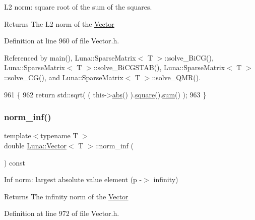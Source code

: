 L2 norm\+: square root of the sum of the squares. 

\begin{DoxyReturn}{Returns}
The L2 norm of the \hyperlink{classLuna_1_1Vector}{Vector} 
\end{DoxyReturn}


Definition at line 960 of file Vector.\+h.



Referenced by main(), Luna\+::\+Sparse\+Matrix$<$ T $>$\+::solve\+\_\+\+Bi\+C\+G(), Luna\+::\+Sparse\+Matrix$<$ T $>$\+::solve\+\_\+\+Bi\+C\+G\+S\+T\+A\+B(), Luna\+::\+Sparse\+Matrix$<$ T $>$\+::solve\+\_\+\+C\+G(), and Luna\+::\+Sparse\+Matrix$<$ T $>$\+::solve\+\_\+\+Q\+M\+R().


\begin{DoxyCode}
961   \{
962     \textcolor{keywordflow}{return} std::sqrt( ( this->\hyperlink{classLuna_1_1Vector_a1fe66d19f6641be9e301a306fdb58cbe}{abs}() ).\hyperlink{classLuna_1_1Vector_a60f8017f50e602151c84686ac081af66}{square}().\hyperlink{classLuna_1_1Vector_a3f9422b246093b153a55577a6ca97e26}{sum}() );
963   \}
\end{DoxyCode}
\mbox{\label{classLuna_1_1Vector_a54e835cea735921c7487fb2451bca258}} 
\subsubsection{\texorpdfstring{norm\+\_\+inf()}{norm\_inf()}}
{\footnotesize\ttfamily template$<$typename T $>$ \\
double \hyperlink{classLuna_1_1Vector}{Luna\+::\+Vector}$<$ T $>$\+::norm\+\_\+inf (\begin{DoxyParamCaption}{ }\end{DoxyParamCaption}) const\hspace{0.3cm}{\ttfamily [inline]}}



Inf norm\+: largest absolute value element (p -\/$>$ infinity) 

\begin{DoxyReturn}{Returns}
The infinity norm of the \hyperlink{classLuna_1_1Vector}{Vector} 
\end{DoxyReturn}


Definition at line 972 of file Vector.\+h.



